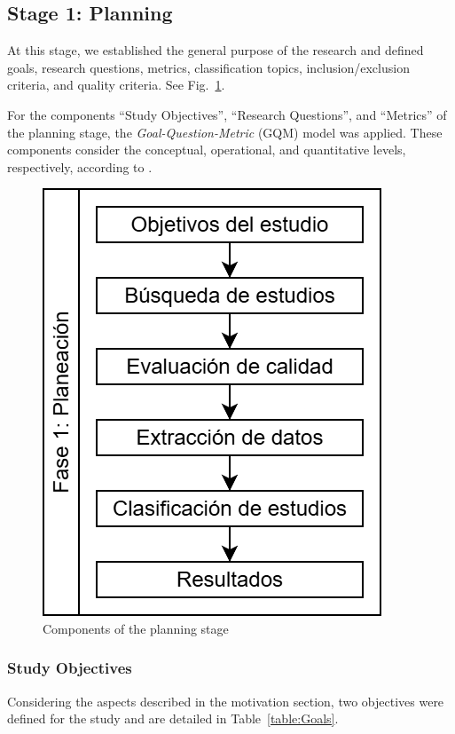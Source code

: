 \subsection{Stage 1: Planning}\label{sec:planeacion}

At this stage, we established the general purpose of the research and defined goals, research questions, metrics, classification topics, inclusion/exclusion criteria, and quality criteria. See Fig.~\ref{fig:PlanningStageOverview}.

For the components ``Study Objectives'', ``Research Questions'', and ``Metrics'' of the planning stage, the {\itshape Goal-Question-Metric} (GQM) model \cite{basili1992software, caldiera1994goal} was applied. These components consider the conceptual, operational, and quantitative levels, respectively, according to \cite{Sepúlveda202141}. 


\begin{figure}[htbp]
	\centering
	\includegraphics[scale=0.4]{resources/figures/sms-Etapa-1 overview.drawio.png}
	\caption{Components of the planning stage}
	\label{fig:PlanningStageOverview}
\end{figure}

\subsubsection{Study Objectives}
Considering the aspects described in the motivation section, two objectives were defined for the study and are detailed in Table~\ref{table:Goals}.

